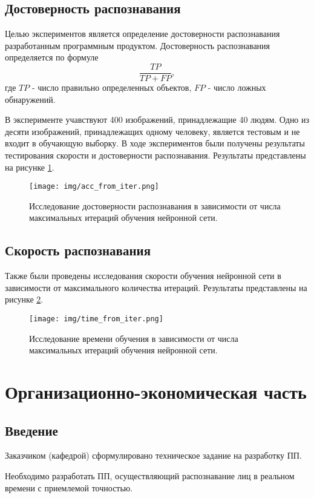 \documentclass[a4paper,12pt]{report}
\numberwithin{equation}{section}
\begin{document}
\subsection{Достоверность распознавания}
Целью экспериментов является определение достоверности распознавания
разработанным программным продуктом. Достоверность распознавания определяется по
формуле
\[ \frac{TP}{TP+FP}, \]
где $TP$ - число правильно определенных объектов, $FP$ - число ложных обнаружений.


В эксперименте учавствуют 400 изображений, принадлежащие 40 людям.  Одно из
десяти изображений, принадлежащих одному человеку, является тестовым и не входит
в обучающую выборку.  В ходе экспериментов были получены результаты тестирования
скорости и достоверности распознавания. Результаты представлены на рисунке
\ref{fig:acc}.

\begin{figure}[h!]
  \centering
  \texttt{[image: img/acc\_from\_iter.png]}
  \caption{Исследование достоверности распознавания в зависимости от числа
максимальных итераций обучения нейронной сети.}
  \label{fig:acc}
\end{figure}

\subsection{Скорость распознавания}
Также были проведены исследования скорости обучения нейронной сети
в зависимости от максимального количества итераций. Результаты представлены на
рисунке \ref{fig:time}.

\begin{figure}[h!]
  \centering
  \texttt{[image: img/time\_from\_iter.png]}
  \caption{Исследование времени обучения в зависимости от числа максимальных 
итераций обучения нейронной сети.}
  \label{fig:time}
\end{figure}

\newpage
\section{Организационно-экономическая часть}
\subsection{Введение}
Заказчиком (кафедрой) сформулировано техническое задание на разработку ПП.

Необходимо разработать ПП, осуществляющий распознавание лиц в реальном времени с
приемлемой точностью.
	
\end{document}
